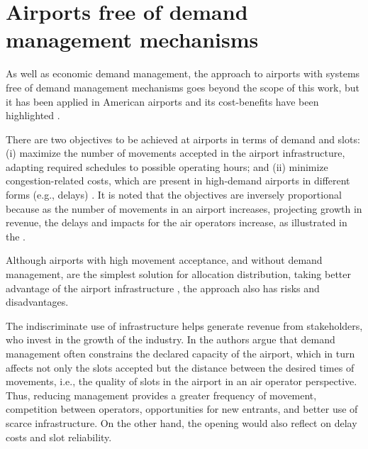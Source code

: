 \section{Airports free of demand management mechanisms}

As well as economic demand management, the approach to airports with systems free of demand management mechanisms goes beyond the scope of this work, but it has been applied in American airports and its cost-benefits have been highlighted \cite{cavusoglu2021minimum, gillen2016airport}.

There are two objectives to be achieved at airports in terms of demand and slots: (i) maximize the number of movements accepted in the airport infrastructure, adapting required schedules to possible operating hours; and (ii) minimize congestion-related costs, which are present in high-demand airports in different forms (e.g., delays) \cite{cavusoglu2021minimum}. It is noted that the objectives are inversely proportional because as the number of movements in an airport increases, projecting growth in revenue, the delays and impacts for the air operators increase, as illustrated in the  \cite{ zografos2017increasing, swaroop2012more, gillen2016airport}.


%

Although airports with high movement acceptance, and without demand management, are the simplest solution for allocation distribution, taking better advantage of the airport infrastructure \cite{gillen2016airport}, the approach also has risks and disadvantages.

The indiscriminate use of infrastructure helps generate revenue from stakeholders, who invest in the growth of the industry. In \cite{zografos2017increasing} the authors argue that demand management often constrains the declared capacity of the airport, which in turn affects not only the slots accepted but the distance between the desired times of movements, i.e., the quality of slots in the airport in an air operator perspective. Thus, reducing management provides a greater frequency of movement, competition between operators, opportunities for new entrants, and better use of scarce infrastructure. On the other hand, the opening would also reflect on delay costs and slot reliability.

